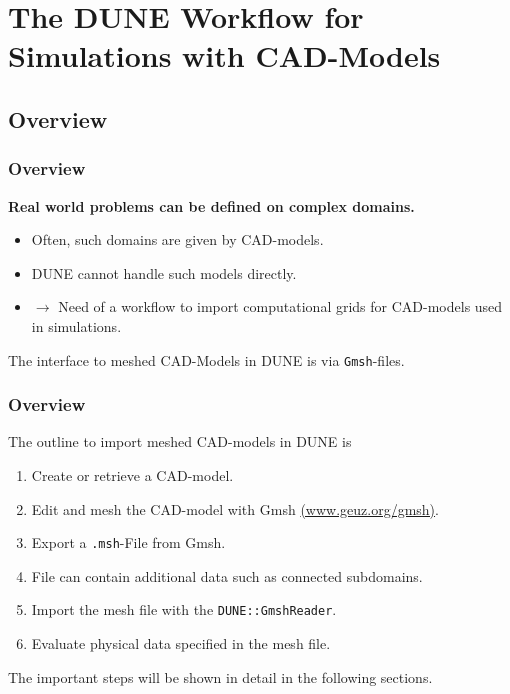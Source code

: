 \section{The DUNE Workflow for Simulations with CAD-Models}\label{Sec:Workflow}

\subsection{Overview}

\begin{frame}
  \frametitle<presentation>{Overview}
  \textbf{Real world problems can be defined on complex domains.}
  \begin{itemize}
    \item Often, such domains are given by CAD-models.
    \item DUNE cannot handle such models directly.
    \item $\rightarrow$ Need of a workflow to import computational grids
      for CAD-models used in simulations.
  \end{itemize}
  The interface to meshed CAD-Models in DUNE is via \lstinline!Gmsh!-files.
\end{frame}

\begin{frame}
  \frametitle<presentation>{Overview}
  The outline to import meshed CAD-models in DUNE is
  \begin{enumerate}
    \item Create or retrieve a CAD-model.
    \item Edit and mesh the CAD-model with Gmsh
      \href{http://www.geuz.org/msh}{(www.geuz.org/gmsh)}.
    \item Export a \lstinline!.msh!-File from Gmsh.
    \item File can contain additional data such as connected subdomains.
    \item Import the mesh file with the \lstinline!DUNE::GmshReader!.
    \item Evaluate physical data specified in the mesh file.
  \end{enumerate}
  The important steps will be shown in detail in the following sections.
\end{frame}


